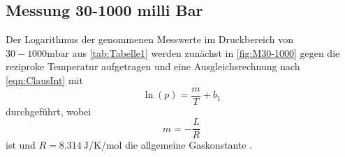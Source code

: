 \subsection{Messung 30-1000 milli Bar}
\label{subsec:M30-1000}
Der Logarithmus der genommenen Messwerte im Druckbereich von $30-1000\unit{\milli\bar}$ aus \autoref{tab:Tabelle1} werden zunächst in \autoref{fig:M30-1000}
gegen die reziproke Temperatur aufgetragen und eine Ausgleichsrechnung nach \eqref{eqn:ClausInt} mit
\begin{equation}
  \ln\left(p\right) = \frac{m}{T} + b_1
\end{equation}
durchgeführt, wobei
\begin{equation*}
  m = -\frac{L}{R}
\end{equation*}
ist und $R =\SI{8,314}{\joule\per\kelvin\per\mol}$ die allgemeine Gaskonstante \cite{Gerth}.
